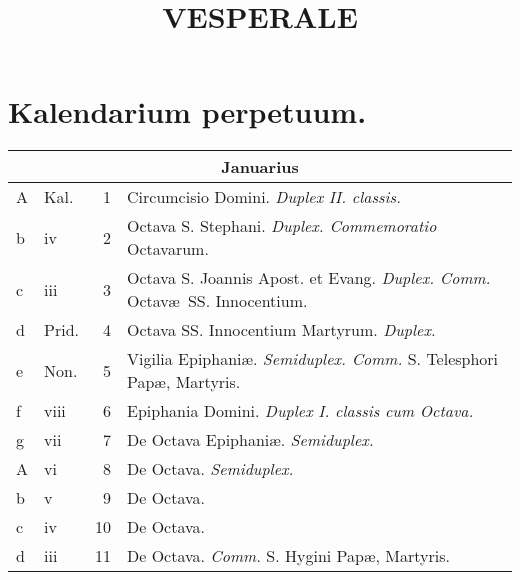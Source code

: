 \documentclass[]{book}
\title{VESPERALE}
\date{}
\begin{document}
\maketitle

\chapter{Kalendarium perpetuum.}

\begin{longtable}{l|l|r|p{.8\linewidth}}

	\hline
	\multicolumn{4}{c}{\textbf{Januarius}} \\
	\hline
	\endhead

	A & Kal.  & 1  & Circumcisio Domini. \textit{Duplex II. classis.} \\
	b & iv    & 2  & Octava S. Stephani. \textit{Duplex. Commemoratio} Octavarum. \\
	c & iii   & 3  & Octava S. Joannis Apost. et Evang. \textit{Duplex. Comm. }Octav\ae\ SS. Innocentium. \\
	d & Prid. & 4  & Octava SS. Innocentium Martyrum. \textit{Duplex.} \\
	e & Non.  & 5  & Vigilia Epiphani\ae. \textit{Semiduplex. Comm.} S. Telesphori Pap\ae, Martyris. \\
	f & viii  & 6  & Epiphania Domini. \textit{Duplex I. classis cum Octava.} \\
	g & vii   & 7  & De Octava Epiphani\ae. \textit{Semiduplex.} \\
	A & vi    & 8  & De Octava. \textit{Semiduplex.} \\
	b & v     & 9  & De Octava. \\
	c & iv    & 10 & De Octava. \\
	d & iii   & 11 & De Octava. \textit{Comm.} S. Hygini Pap\ae, Martyris. \\

	
\end{longtable}

	
\end{document}

